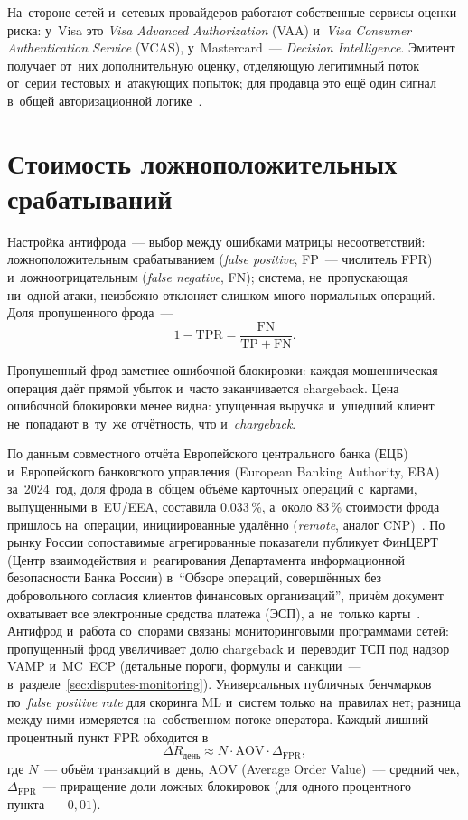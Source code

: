 На~стороне сетей и~сетевых провайдеров работают собственные сервисы оценки
риска: у~Visa это \textit{Visa Advanced Authorization} (VAA)
и~\textit{Visa Consumer Authentication Service} (VCAS), у~Mastercard~---
\textit{Decision Intelligence}. Эмитент получает от~них дополнительную оценку,
отделяющую легитимный поток от~серии тестовых и~атакующих попыток; для продавца
это ещё один сигнал в~общей авторизационной
логике~\cite{visa-auth-management-2020,mc-decision-intelligence}.

\section{Стоимость ложноположительных срабатываний}\label{sec:fraud-false-positive}
\enlargethispage{5\baselineskip}

Настройка антифрода~--- выбор между ошибками матрицы несоответствий:
ложноположительным срабатыванием
(\textit{false positive}, FP~--- числитель FPR) и~ложноотрицательным
(\textit{false negative}, FN); система, не~пропускающая ни~одной атаки,
неизбежно отклоняет слишком много нормальных операций. Доля пропущенного фрода~---
\[
  1 - \mathrm{TPR} = \frac{\mathrm{FN}}{\mathrm{TP} + \mathrm{FN}}.
\]

Пропущенный фрод заметнее ошибочной блокировки: каждая мошенническая операция
даёт прямой убыток и~часто заканчивается chargeback. Цена ошибочной
блокировки менее видна: упущенная выручка и~ушедший клиент не~попадают
в~ту~же отчётность, что и~\textit{chargeback}.

По данным совместного отчёта Европейского центрального банка (ЕЦБ)
и~Европейского банковского управления (European Banking Authority, EBA)
за~2024~год, доля фрода в~общем объёме карточных операций с~картами,
выпущенными в~EU/EEA, составила 0,033\,\%, а~около 83\,\% стоимости фрода
пришлось на~операции, инициированные удалённо (\textit{remote}, аналог
CNP)~\cite{ecb-eba-payment-fraud-2025}. По рынку России сопоставимые
агрегированные показатели публикует ФинЦЕРТ (Центр взаимодействия
и~реагирования Департамента информационной безопасности Банка России)
в~\enquote{Обзоре операций, совершённых без добровольного согласия клиентов
финансовых организаций}, причём документ охватывает все электронные средства
платежа (ЭСП), а~не~только карты~\cite{cbr-fincert-fraud-overview}. Антифрод
и~работа со~спорами связаны мониторинговыми программами сетей: пропущенный фрод
увеличивает долю chargeback и~переводит ТСП под надзор VAMP и~MC~ECP
(детальные пороги, формулы и~санкции~---
в~разделе~\ref{sec:disputes-monitoring}). Универсальных публичных бенчмарков
по~\textit{false positive rate} для скоринга ML и~систем только на~правилах
нет; разница между ними измеряется на~собственном потоке оператора. Каждый
лишний процентный пункт FPR обходится в
\[
  \Delta R_{\text{день}} \approx N \cdot \mathrm{AOV} \cdot \Delta_{\mathrm{FPR}},
\]
где $N$~--- объём транзакций в~день, $\mathrm{AOV}$ (Average Order Value)~---
средний чек, $\Delta_{\mathrm{FPR}}$~--- приращение доли ложных блокировок
(для одного процентного пункта~--- $0{,}01$).

